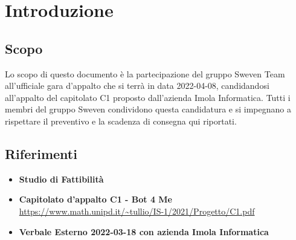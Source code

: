 \section{Introduzione}
\subsection{Scopo}
    Lo scopo di questo documento è la partecipazione del gruppo Sweven Team 
    all'ufficiale gara d'appalto che si terrà in data 2022-04-08, 
    candidandosi all'appalto del capitolato C1 proposto dall'azienda Imola Informatica.
    \newline
    Tutti i membri del gruppo Sweven condividono questa candidatura e si impegnano a 
    rispettare il preventivo e la scadenza di consegna qui riportati.
\subsection{Riferimenti}
\begin{itemize}
    \item \textbf{Studio di Fattibilità}
    \item \textbf{Capitolato d'appalto C1 - Bot 4 Me}\newline
	\url{https://www.math.unipd.it/~tullio/IS-1/2021/Progetto/C1.pdf}
	\item \textbf{Verbale Esterno 2022-03-18 con azienda Imola Informatica}
\end{itemize}